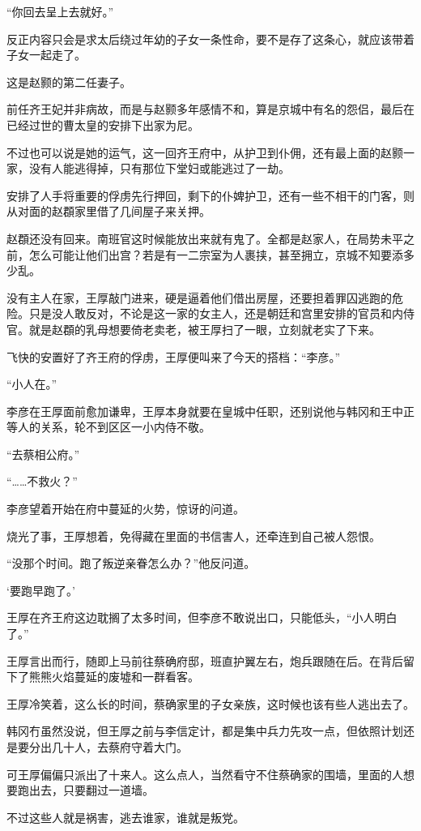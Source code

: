 “你回去呈上去就好。”

反正内容只会是求太后绕过年幼的子女一条性命，要不是存了这条心，就应该带着子女一起走了。

这是赵颢的第二任妻子。

前任齐王妃并非病故，而是与赵颢多年感情不和，算是京城中有名的怨侣，最后在已经过世的曹太皇的安排下出家为尼。

不过也可以说是她的运气，这一回齐王府中，从护卫到仆佣，还有最上面的赵颢一家，没有人能逃得掉，只有那位下堂妇或能逃过了一劫。

安排了人手将重要的俘虏先行押回，剩下的仆婢护卫，还有一些不相干的门客，则从对面的赵頵家里借了几间屋子来关押。

赵頵还没有回来。南班官这时候能放出来就有鬼了。全都是赵家人，在局势未平之前，怎么可能让他们出宫？若是有一二宗室为人裹挟，甚至拥立，京城不知要添多少乱。

没有主人在家，王厚敲门进来，硬是逼着他们借出房屋，还要担着罪囚逃跑的危险。只是没人敢反对，不论是这一家的女主人，还是朝廷和宫里安排的官员和内侍官。就是赵頵的乳母想要倚老卖老，被王厚扫了一眼，立刻就老实了下来。

飞快的安置好了齐王府的俘虏，王厚便叫来了今天的搭档：“李彦。”

“小人在。”

李彦在王厚面前愈加谦卑，王厚本身就要在皇城中任职，还别说他与韩冈和王中正等人的关系，轮不到区区一小内侍不敬。

“去蔡相公府。”

“……不救火？”

李彦望着开始在府中蔓延的火势，惊讶的问道。

烧光了事，王厚想着，免得藏在里面的书信害人，还牵连到自己被人怨恨。

“没那个时间。跑了叛逆亲眷怎么办？”他反问道。

‘要跑早跑了。’

王厚在齐王府这边耽搁了太多时间，但李彦不敢说出口，只能低头，“小人明白了。”

王厚言出而行，随即上马前往蔡确府邸，班直护翼左右，炮兵跟随在后。在背后留下了熊熊火焰蔓延的废墟和一群看客。

王厚冷笑着，这么长的时间，蔡确家里的子女亲族，这时候也该有些人逃出去了。

韩冈冇虽然没说，但王厚之前与李信定计，都是集中兵力先攻一点，但依照计划还是要分出几十人，去蔡府守着大门。

可王厚偏偏只派出了十来人。这么点人，当然看守不住蔡确家的围墙，里面的人想要跑出去，只要翻过一道墙。

不过这些人就是祸害，逃去谁家，谁就是叛党。

